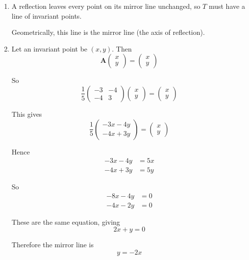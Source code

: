 \documentclass[leqno]{article}
\begin{document}
\begin{enumerate}[
  label=\textbf{\arabic*.},
  leftmargin=*,
  topsep=0pt,
  partopsep=0pt,
  parsep=0pt
]
\begin{djsSolution}
\begin{enumerate}[label=\textbf{(\alph*)}]
  \item A reflection leaves every point on its mirror line unchanged, so $T$ must have a line of invariant points.

  Geometrically, this line is the mirror line (the axis of reflection).

  \item Let an invariant point be $(x,y)$. Then
  \[
  \mathbf{A}\begin{pmatrix}x\\y\end{pmatrix}=\begin{pmatrix}x\\y\end{pmatrix}
  \]

  So
  \[
  \frac{1}{5}
  \begin{pmatrix}
  -3 & -4\\
  -4 & 3
  \end{pmatrix}
  \begin{pmatrix}x\\y\end{pmatrix}
  =
  \begin{pmatrix}x\\y\end{pmatrix}
  \]

  This gives
  \[
  \frac{1}{5}
  \begin{pmatrix}
  -3x-4y\\
  -4x+3y
  \end{pmatrix}
  =
  \begin{pmatrix}x\\y\end{pmatrix}
  \]

  Hence
  \begin{align*}
  -3x-4y&=5x\\
  -4x+3y&=5y
  \end{align*}

  So
  \begin{align*}
  -8x-4y&=0\\
  -4x-2y&=0
  \end{align*}

  These are the same equation, giving
  \[
  2x+y=0
  \]

  Therefore the mirror line is
  \[
  y=-2x
  \]


\end{enumerate}
\end{djsSolution}
\end{enumerate}
\end{document}
